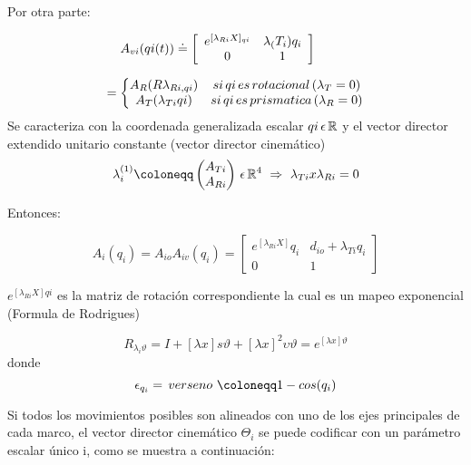     Por otra parte:

    \begin{equation*}
        \hspace{-10mm}
        A_{vi} (qi(t)) \doteq \left[
            \begin{array}{cc}
                e^{[\lambda_{Ri}X]_{qi}} & \lambda_(T_i)q_i\\
                0 & 1\\
            \end{array}\right]  
    \end{equation*} 

    $$ = 
    \left\{\begin{matrix}
    A_R (R\lambda_{Ri,qi}) & si \thinspace qi \thinspace es \thinspace rotacional \thinspace(\lambda_T=0) \\ 
    A_T (\lambda_{Ti}qi) & si \thinspace qi \thinspace es \thinspace prismatica \thinspace(\lambda_R=0) \\ 
    \end{matrix}\right.
    $$
    Se caracteriza con la coordenada generalizada escalar $qi\thinspace \epsilon \thinspace \mathbb{R} $ y el
    vector director extendido unitario constante (vector director cinemático)
    $$\lambda_{i}^{(1)} \coloneqq   
    \begin{pmatrix} A_{Ti} \\ A_{Ri} \\ \end{pmatrix} \thinspace   \epsilon \thinspace \mathbb{R}^4 \thinspace
    \thinspace \Rightarrow \thinspace \thinspace \lambda_{Ti}x\lambda_{Ri}=0$$

    Entonces:

    $$A_{i}(q_{i})=A_{io}A_{iv}(q_{i})=\begin{bmatrix} e^{[\lambda_{Ri}X]}q_{i}& d_{io}+\lambda_{Ti}q_{i}\\ 0 & 1\end{bmatrix}$$

    $e^{[\lambda_{Ri}X]qi}$ es la matriz de rotación correspondiente la cual es un mapeo exponencial (Formula de Rodrigues)

    $$R_{\lambda_{i}\vartheta}=I+[\lambda x]s\vartheta+[\lambda x]^{2}\upsilon\vartheta=e^{[\lambda x]\vartheta}$$
    donde
    $$ \epsilon_{q_i} = \thinspace verseno  \thinspace\thinspace \coloneqq  1 - cos(q_{i})$$ 

    Si todos los movimientos posibles son alineados con uno de los ejes principales de cada marco, el vector director
    cinemático $\Theta_i$ se puede codificar con un parámetro escalar único i, como se muestra a continuación:

